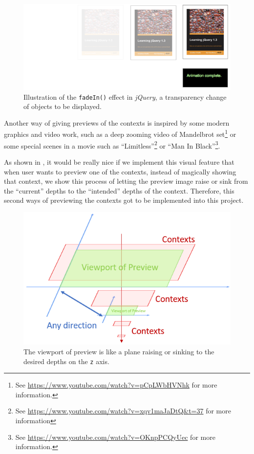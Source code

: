 \begin{figure}[H]
\centering
\includegraphics[width=\textwidth,keepaspectratio]{Figures/Chapter1/jqfadein.png}
\decoRule
\caption[Fade-in Effect in jQuery]{Illustration of the \texttt{fadeIn()} effect in \emph{jQuery}, a transparency change of objects to be displayed.}
\label{fig:jqfadein}
\end{figure}

Another way of giving previews of the contexts is inspired by some modern graphics and video work, such as a deep zooming video of Mandelbrot set\footnote{ See \url{https://www.youtube.com/watch?v=pCpLWbHVNhk} for more information.} or some special scenes in a movie such as ``Limitless''\footnote{ See \url{https://www.youtube.com/watch?v=xqv1maJaDtQ&t=37} for more information} or ``Man In Black''\footnote{ See \url{https://www.youtube.com/watch?v=OKnpPCQyUec} for more information.}.

As shown in , it would be really nice if we implement this visual feature that when user wants to preview one of the contexts, instead of magically showing that context, we show this process of letting the preview image raise or sink from the ``current'' depths to the ``intended'' depths of the context. Therefore, this second ways of previewing the contexts got to be implemented into this project.

\begin{figure}[H]
\centering
\includegraphics[width=.8\textwidth,keepaspectratio]{Figures/Chapter1/zoompreview.png}
\decoRule
\caption[Moving Preview Plane on Context Views]{The viewport of preview is like a plane raising or sinking to the desired depths on the \texttt{z} axis.}
\label{fig:zoompreview}
\end{figure}

